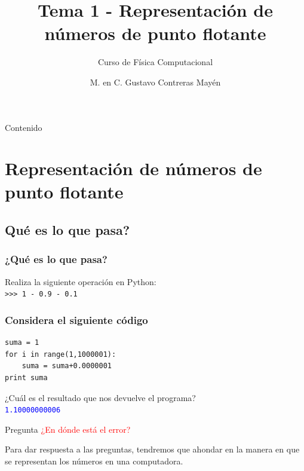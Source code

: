 

\title{Tema 1 - Representación de números de punto flotante}
\subtitle{Curso de Física Computacional}
\author[]{M. en C. Gustavo Contreras Mayén}
\date{}

\maketitle
\fontsize{14}{14}\selectfont
{}
\begin{frame}{Contenido}
\tableofcontents[pausesections]
\end{frame}
\section{Representación de números de punto flotante}
\subsection{Qué es lo que pasa?}
\begin{frame}[fragile]
\frametitle{¿Qué es lo que pasa?}
Realiza la siguiente operación en Python:
\\
\bigskip
\texttt{>>> 1 - 0.9 - 0.1}
\\
\medskip
{}
\end{frame}
\begin{frame}[fragile]
\frametitle{Considera el siguiente código}
\begin{lstlisting}
suma = 1
for i in range(1,1000001):
    suma = suma+0.0000001
print suma
\end{lstlisting}
¿Cuál es el resultado que nos devuelve el programa?
\\
\bigskip
\pause
\textcolor{blue}{\texttt{1.10000000006}}
\\
\medskip
\pause
\begin{alertblock}{Pregunta}
\textcolor{red}{¿En dónde está el error?}
\end{alertblock}
\end{frame}
\begin{frame}
Para dar respuesta a las preguntas, tendremos que ahondar en la manera en que se representan los números en una computadora.
\end{frame}
